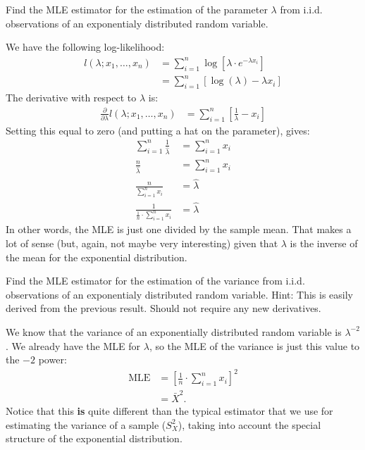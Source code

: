 
Find the MLE estimator for the estimation of the parameter $\lambda$ from
i.i.d. observations of an exponentialy distributed random variable.


We have the following log-likelihood:
\begin{align*}
l(\lambda; x_1, \ldots, x_n) &= \sum_{i=1}^n \log\left[ \lambda \cdot e^{-\lambda x_i} \right] \\
&= \sum_{i=1}^n \left[\log(\lambda) - \lambda x_i \right]
\end{align*}
The derivative with respect to $\lambda$ is:
\begin{align*}
\frac{\partial}{\partial \lambda} l(\lambda; x_1, \ldots, x_n)
&= \sum_{i=1}^n \left[ \frac{1}{\lambda} - x_i \right] 
\end{align*}
Setting this equal to zero (and putting a hat on the parameter), gives:
\begin{align*}
\sum_{i=1}^n \frac{1}{\hat{\lambda}} &= \sum_{i=1}^n x_i \\
\frac{n}{\hat{\lambda}} &= \sum_{i=1}^n x_i \\
\frac{n}{\sum_{i=1}^n x_i} &= \hat{\lambda} \\
\frac{1}{\frac{1}{n} \cdot \sum_{i=1}^n x_i} &= \hat{\lambda} 
\end{align*}
In other words, the MLE is just one divided by the sample mean. That makes
a lot of sense (but, again, not maybe very interesting) given that $\lambda$
is the inverse of the mean for the exponential distribution.


Find the MLE estimator for the estimation of the variance from
i.i.d. observations of an exponentialy distributed random variable.
Hint: This is easily derived from the previous result. Should not 
require any new derivatives.


We know that the variance of an exponentially distributed random variable
is $\lambda^{-2}$. We already have the MLE for $\lambda$, so the MLE of the
variance is just this value to the $-2$ power:
\begin{align*}
\text{MLE} &= \left[ \frac{1}{n} \cdot \sum_{i=1}^n x_i \right]^2 \\
&= \bar{X}^2.
\end{align*}
Notice that this \textbf{is} quite different than the typical estimator that
we use for estimating the variance of a sample ($S_X^2$), taking into account
the special structure of the exponential distribution.

